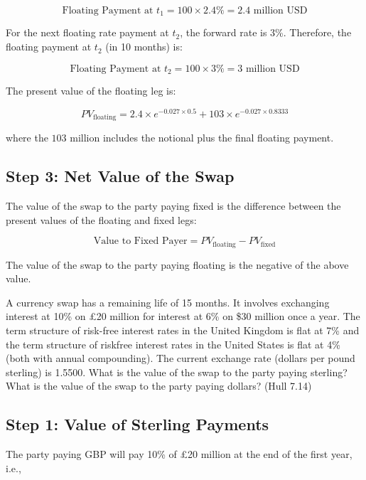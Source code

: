 \documentclass[12pt,letterpaper, onecolumn]{exam}
\begin{document}
\begin{questions}
\begin{solution}
\[
\text{Floating Payment at } t_1 = 100 \times 2.4\% = 2.4 \text{ million USD}
\]

For the next floating rate payment at $t_2$, the forward rate is 3\%. Therefore, the floating payment at $t_2$ (in 10 months) is:

\[
\text{Floating Payment at } t_2 = 100 \times 3\% = 3 \text{ million USD}
\]

The present value of the floating leg is:

\[
PV_{\text{floating}} = 2.4 \times e^{-0.027 \times 0.5} + 103 \times e^{-0.027 \times 0.8333}
\]

where the $103$ million includes the notional plus the final floating payment.

\subsection*{Step 3: Net Value of the Swap}

The value of the swap to the party paying fixed is the difference between the present values of the floating and fixed legs:

\[
\text{Value to Fixed Payer} = PV_{\text{floating}} - PV_{\text{fixed}}
\]

The value of the swap to the party paying floating is the negative of the above value.


\end{solution}


    \newpage
    
    \question A currency swap has a remaining life of 15 months. It involves exchanging interest at
10\% on £20 million for interest at 6\% on \$30 million once a year. The term structure of
risk-free interest rates in the United Kingdom is flat at 7\% and the term structure of
riskfree interest rates in the United States is flat at 4\% (both with annual compounding).
The current exchange rate (dollars per pound sterling) is 1.5500. What is the value of the
swap to the party paying sterling? What is the value of the swap to the party paying
dollars? (Hull 7.14)

    \begin{solution}
    \subsection*{Step 1: Value of Sterling Payments}

The party paying GBP will pay 10\% of £20 million at the end of the first year, i.e.,


\end{solution}
\end{questions}
\end{document}
